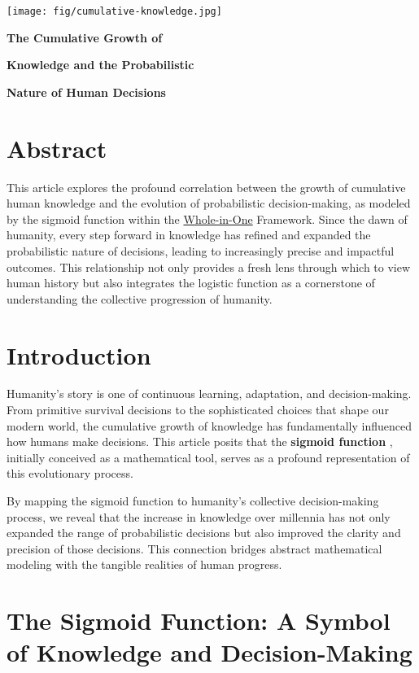 \documentclass[a4]{article}
\newcommand{\bn}{\bigskip\noindent}
\newcommand{\mn}{\medskip\noindent}
\begin{document}
\begin{center}
\texttt{[image: fig/cumulative-knowledge.jpg]}
\end{center}

\mn
{\huge\bf The Cumulative Growth of}

\bn
{\huge\bf Knowledge and the Probabilistic}

\bn
{\huge\bf Nature of Human Decisions}

\bn
\section*{Abstract}

This article explores the profound correlation between the growth of cumulative human knowledge and the evolution of probabilistic decision-making, as modeled by the sigmoid function within the 
\href{https://blog.quantiota.ai/page/17/the-global-neural-network-humanity-s-infinite-learning-process/}{Whole-in-One}
Framework. Since the dawn of humanity, every step forward in knowledge has refined and expanded the probabilistic nature of decisions, leading to increasingly precise and impactful outcomes. This relationship not only provides a fresh lens through which to view human history but also integrates the logistic function as a cornerstone of understanding the collective progression of humanity.


\section{Introduction}  

Humanity's story is one of continuous learning, adaptation, and decision-making. From primitive survival decisions to the sophisticated choices that shape our modern world, the cumulative growth of knowledge has fundamentally influenced how humans make decisions. This article posits that the {\bf sigmoid function} , initially conceived as a mathematical tool, serves as a profound representation of this evolutionary process.

\bn
By mapping the sigmoid function to humanity's collective decision-making process, we reveal that the increase in knowledge over millennia has not only expanded the range of probabilistic decisions but also improved the clarity and precision of those decisions. This connection bridges abstract mathematical modeling with the tangible realities of human progress.


\section{The Sigmoid Function: A Symbol of Knowledge and Decision-Making}
\end{document}
